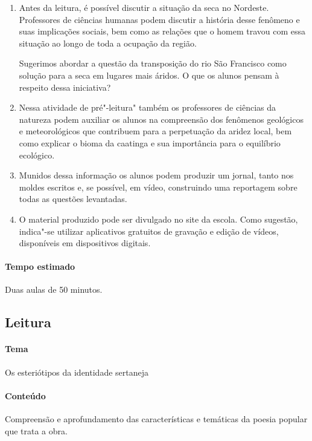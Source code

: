 \documentclass[12pt]{extarticle}
\begin{document}
\begin{enumerate}
\item
Antes da leitura, é possível discutir a situação da seca no
Nordeste. Professores de ciências humanas podem discutir a história
desse fenômeno e suas implicações sociais, bem como as relações que o
homem travou com essa situação ao longo de toda a ocupação da região.

Sugerimos abordar a questão da transposição do rio São Francisco como 
solução para a seca em lugares mais áridos. O que os alunos pensam à respeito 
dessa iniciativa? 

\item
Nessa atividade de pré"-leitura" também os professores de ciências da natureza 
podem auxiliar os alunos na compreensão dos fenômenos geológicos e meteorológicos que
contribuem para a perpetuação da aridez local, bem como explicar o bioma
da caatinga e sua importância para o equilíbrio ecológico. 

\item
Munidos dessa informação os alunos podem produzir um jornal, tanto nos moldes
escritos e, se possível, em vídeo, construindo uma reportagem sobre todas as
questões levantadas. 

\item
O material produzido pode ser divulgado no site da
escola. Como sugestão, indica"-se utilizar aplicativos gratuitos de
gravação e edição de vídeos, disponíveis em dispositivos digitais.

\end{enumerate}

\paragraph{Tempo estimado} Duas aulas de 50 minutos. 


\subsection{Leitura}

\paragraph{Tema} Os esteriótipos da identidade sertaneja 


\paragraph{Conteúdo} Compreensão e aprofundamento das características e temáticas da poesia popular
que trata a obra.
\end{document}
